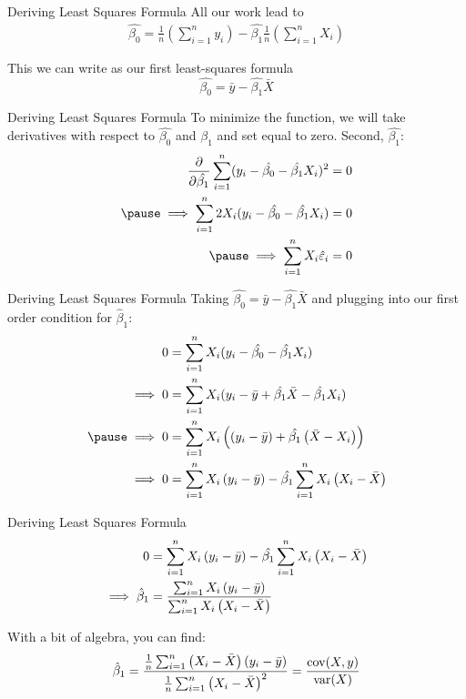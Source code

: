 \documentclass[aspectratio=169,t,11pt,table]{beamer}
\begin{document}
\begin{frame}{Deriving Least Squares Formula}
  All our work lead to
  \begin{align*}
    \hat{\beta_0} = \frac{1}{n} \left(\sum_{i=1}^n y_i \right) - \hat{\beta_1} \frac{1}{n} \left( \sum_{i=1}^n X_i \right) 
  \end{align*}  

  \bigskip 
  This we can write as our first least-squares formula
  $$\hat{\beta_0} = \bar{y} - \hat{\beta_1} \bar{X}$$
\end{frame}


\begin{frame}{Deriving Least Squares Formula}
  To minimize the function, we will take derivatives with respect to $\hat{\beta_0}$ and $\hat{\beta_1}$ and set equal to zero. Second, $\hat{\beta_1}$:
  \begin{align*}
    \frac{\partial}{\partial \hat{\beta_1}} \sum_{i=1}^n (y_i - \hat{\beta_0} - \hat{\beta_1} X_i)^2 &= 0 \\
    \pause
    \implies \sum_{i=1}^n 2 X_i (y_i - \hat{\beta_0} - \hat{\beta_1} X_i) &= 0 \\
    \pause
    \implies \sum_{i=1}^n X_i \hat{\varepsilon}_i &= 0
  \end{align*}
\end{frame}

\begin{frame}{Deriving Least Squares Formula}
  Taking $\hat{\beta_0} = \bar{y} - \hat{\beta_1} \bar{X}$ and plugging into our first order condition for $\hat{\beta}_1$:
  \begin{align*}
    0 &= \sum_{i=1}^n X_i (y_i - \hat{\beta_0} - \hat{\beta_1} X_i) \\
    \implies 0 &= \sum_{i=1}^n X_i (y_i - \bar{y} + \hat{\beta_1} \bar{X} - \hat{\beta_1} X_i) \\
    \pause
    \implies 0 &= \sum_{i=1}^n X_i \left( \left( y_i - \bar{y} \right) + \hat{\beta_1} \left( \bar{X} - X_i \right) \right) \\
    \implies 0 &= \sum_{i=1}^n X_i \left( y_i - \bar{y} \right) - \hat{\beta_1} \sum_{i=1}^n X_i \left( X_i - \bar{X} \right) \\
  \end{align*}
\end{frame}

\begin{frame}{Deriving Least Squares Formula}
  \begin{align*}
    0 &= \sum_{i=1}^n X_i \left( y_i - \bar{y} \right) - \hat{\beta_1} \sum_{i=1}^n X_i \left( X_i - \bar{X} \right) \\
    \smallskip
    \implies \hat{\beta}_1 &= \frac{\sum_{i=1}^n X_i \left( y_i - \bar{y} \right)}{\sum_{i=1}^n X_i \left( X_i - \bar{X} \right)}
  \end{align*}

  With a bit of algebra, you can find:
  \begin{align*}
    \hat{\beta}_1 = \frac{\frac{1}{n} \sum_{i=1}^n \left( X_i - \bar{X} \right) \left( y_i - \bar{y} \right)}{\frac{1}{n} \sum_{i=1}^n \left( X_i - \bar{X} \right)^2} = \frac{\cov(X, y)}{\var(X)}
  \end{align*} 
\end{frame}
\end{document}
